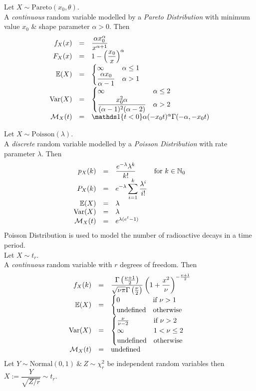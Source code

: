 \documentclass[11pt,a4paper]{article}
\begin{document}
Let $X\sim\text{Pareto}(x_0,\theta)$.\\
A \textit{continuous} random variable modelled by a \textit{Pareto Distribution} with minimum value $x_0$ \& shape parameter $\alpha>0$. Then
\[\begin{array}{rcll}
f_X(x)&=&\dfrac{\alpha x_0^\alpha}{x^{\alpha+1}}\\
F_X(x)&=&1-\left(\dfrac{x_0}{x}\right)^\alpha\\
\expect(X)&=&\begin{cases}\infty&\alpha\leq1\\\dfrac{\alpha x_0}{\alpha-1}&\alpha>1\end{cases}\\
\var(X)&=&\begin{cases}\infty&\alpha\leq2\\\dfrac{x_0^2\alpha}{(\alpha-1)^2(\alpha-2)}&\alpha>2\end{cases}\\
\mathcal{M}_X(t)&=&\indicator\{t<0\}\alpha(-x_0t)^\alpha\Gamma(-\alpha,-x_0t)
\end{array}\]

Let $X\sim\text{Poisson}(\lambda)$.\\
A \textit{discrete} random variable modelled by a \textit{Poisson Distribution} with rate parameter $\lambda$. Then
\[\begin{array}{rcll}
p_X(k)&=&\dfrac{e^{-\lambda}\lambda^k}{k!}&\text{for }k\in\mathbb{N}_0\\
P_X(k)&=&{\displaystyle e^{-\lambda}\sum_{i=1}^k\frac{\lambda^i}{i!}}\\
\mathbb{E}(X)&=&\lambda\\
\mathrm{Var}(X)&=&\lambda\\
\mathcal{M}_X(t)&=&e^{\lambda(e^t-1)}
\end{array}\]
\nb Poisson Distribution is used to model the number of radioactive decays in a time period.\\

Let $X\sim t_r$.\\
A \textit{continuous} random variable with $r$ degrees of freedom. Then
\[\begin{array}{rcll}
f_X(k)&=&{\displaystyle\frac{\Gamma\left(\frac{\nu+1}{2}\right)}{\sqrt{\nu\pi}\Gamma\left(\frac{\nu}{2}\right)}\left(1+\frac{x^2}{\nu}\right)^{-\frac{\nu+1}{2}}}\\
\mathbb{E}(X)&=&\begin{cases}0&\text{if }\nu>1\\\text{undefined}&\text{otherwise}\end{cases}\\
\mathrm{Var}(X)&=&\begin{cases}\frac{\nu}{\nu-2}&\text{if }\nu>2\\\infty&1<\nu\leq2\\\text{undefined}&\text{otherwise}\end{cases}\\
\mathcal{M}_X(t)&=&\text{undefined}
\end{array}\]
\nb Let $Y\sim\text{Normal}(0,1)\ \&\ Z\sim\chi^2_r$ be independent random variables then $X:=\dfrac{Y}{\sqrt{Z/r}}\sim t_r$.\\
\end{document}
